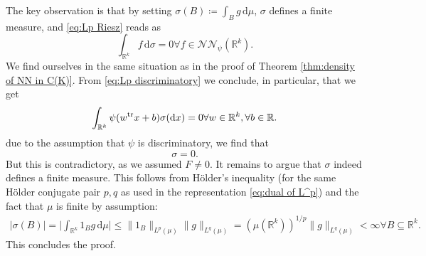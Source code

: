 \documentclass[11pt,a4paper,twoside,openany]{report}
\numberwithin{equation}{section}
\newcommand{\diff}{\mathrm{d}}
\theoremstyle{plain} %
\theoremstyle{definition} %
\theoremstyle{remark} %
\begin{document}
The key observation is that by setting \(\sigma(B)\coloneqq\int_B g\,\diff \mu\), \(\sigma\) defines a finite measure, and 
\eqref{eq:Lp Riesz} reads as 
\begin{equation}\label{eq:Lp discriminatory}
        \int_{\mathbb{R}^k}f\,\diff \sigma=0\forall f\in \mathcal{NN}_{\psi}(\mathbb{R}^k).
\end{equation}
We find ourselves in the same situation as in the proof of Theorem \ref{thm:density of NN in C(K)}.
    From \eqref{eq:Lp discriminatory} we conclude, in particular, that we get 
   \begin{equation*}
        \int_{\mathbb{R}^k}\psi(w^{\rm{tr}}x+b) \sigma(\diff x)=0\forall w\in\mathbb{R}^k,\forall b\in\mathbb{R}.
\end{equation*}
due to the assumption that \(\psi\) is discriminatory, we find that
    \begin{equation*}
        \sigma = 0.
    \end{equation*}
    But this is contradictory, as we assumed \(F\neq 0\). It remains to argue that \(\sigma\) indeed defines a finite measure. 
    This follows from Hölder's inequality (for the same Hölder conjugate pair \(p,q\) as used in the representation \eqref{eq:dual of L^p}) and the fact that \(\mu\) is finite by assumption:
    \begin{align*}
        |\sigma(B)|=\bigg|\int_{\mathbb{R}^k}1_B g\,\diff \mu\bigg|\leq \lVert 1_{B}\rVert_{L^p(\mu)}\lVert g \rVert_{L^q(\mu)}=(\mu(\mathbb{R}^k))^{1/p}\lVert g\rVert_{L^q(\mu)}<\infty\forall B\subseteq \mathbb{R}^k.
    \end{align*}
    This concludes the proof.
\end{document}
